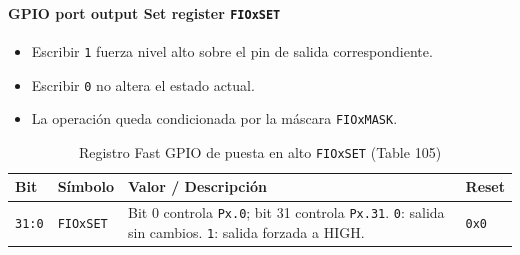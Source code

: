 \paragraph{GPIO port output Set register \texttt{FIOxSET}}
\begin{itemize}
  \item Escribir \texttt{1} fuerza nivel alto sobre el pin de salida correspondiente.
  \item Escribir \texttt{0} no altera el estado actual.
  \item La operación queda condicionada por la máscara \texttt{FIOxMASK}.
\end{itemize}

\begin{table}[H]
  \centering
  \small
  \caption{Registro Fast GPIO de puesta en alto \texttt{FIOxSET} (Table 105)}
  \begin{tabularx}{0.96\textwidth}{|>{\centering\arraybackslash}p{}|>{\raggedright\arraybackslash}p{}|>{\raggedright\arraybackslash}X|>{\centering\arraybackslash}p{}|}
    \hline
    \textbf{Bit} & \textbf{Símbolo} & \textbf{Valor / Descripción} & \textbf{Reset} \\
    \hline
    \texttt{31:0} & \texttt{FIOxSET} & Bit 0 controla \texttt{Px.0}; bit 31 controla \texttt{Px.31}. \texttt{0}: salida sin cambios. \texttt{1}: salida forzada a HIGH. & \texttt{0x0} \\
    \hline
  \end{tabularx}
\end{table}

